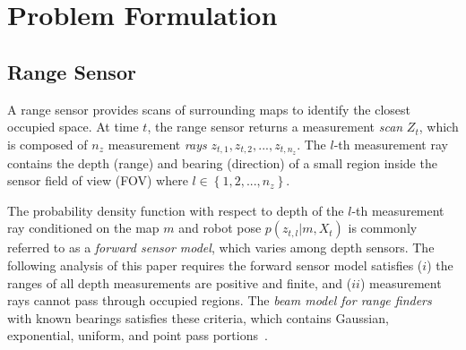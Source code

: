 \documentclass[letterpaper, 10pt, conference]{ieeeconf}
\newcommand{\braces}[1]{\ensuremath{\left\{ #1 \right\}}}
\begin{document}
\section{Problem Formulation}
\label{sec:ProbForm}

\subsection{Range Sensor}

A range sensor provides scans of surrounding maps to identify the closest occupied space.
At time $t$, the range sensor returns a measurement \emph{scan} $Z_t$, which is composed of $n_z$ measurement \emph{rays} $z_{t,1},z_{t,2},...,z_{t,n_z}$. 
The $l$-th measurement ray contains the depth (range) and bearing (direction) of a small region inside the sensor field of view (FOV) where $l\in\braces{1,2,...,n_z}$.

The probability density function with respect to depth of the $l$-th measurement ray conditioned on the map $m$ and robot pose $p(z_{t,l}|m,X_t)$ is commonly referred to as a \emph{forward sensor model}, which varies among depth sensors.
The following analysis of this paper requires the forward sensor model satisfies  ($i$) the ranges of all depth measurements are positive and finite, and ($ii$) measurement rays cannot pass through occupied regions.
The \emph{beam model for range finders} with known bearings satisfies these criteria, which contains Gaussian, exponential, uniform, and point pass portions~\cite{ThrBurFox05}.
\end{document}
